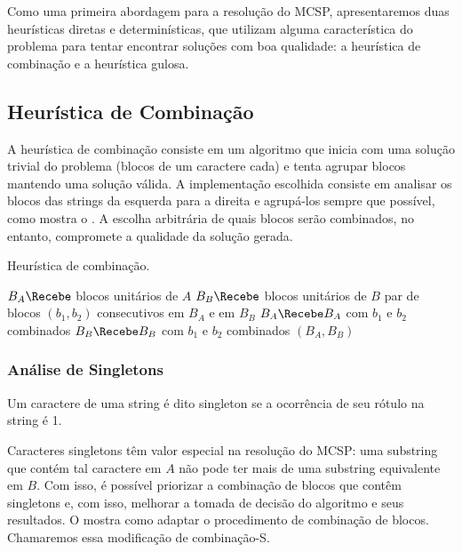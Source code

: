Como uma primeira abordagem para a resolução do MCSP, apresentaremos duas heurísticas diretas e determinísticas, que utilizam alguma característica do problema para tentar encontrar soluções com boa qualidade: a heurística de combinação e a heurística gulosa.

\subsection{Heurística de Combinação}

    A heurística de combinação consiste em um algoritmo que inicia com uma solução trivial do problema (blocos de um caractere cada) e tenta agrupar blocos mantendo uma solução válida. A implementação escolhida consiste em analisar os blocos das strings da esquerda para a direita e agrupá-los sempre que possível, como mostra o . A escolha arbitrária de quais blocos serão combinados, no entanto, compromete a qualidade da solução gerada.

    \begin{algorithm}[htb]
        \caption{Heurística de combinação.}
        \label{alg:combine}

        \begin{codebox}
        \li $B_A \Recebe$ blocos unitários de $A$
        \li $B_B \Recebe$ blocos unitários de $B$
        \li \Para \Cada par de blocos $(b_1, b_2)$ consecutivos em $B_A$ e em $B_B$ \Faca
            \Do
        \li     $B_A \Recebe B_A$ com $b_1$ e $b_2$ combinados
        \li     $B_B \Recebe B_B$ com $b_1$ e $b_2$ combinados
            \End
        \li \Devolva $(B_A, B_B)$
        \end{codebox}
    \end{algorithm}

    \subsubsection{Análise de Singletons}

        \begin{definition}[Singleton]
            Um caractere de uma string é dito singleton se a ocorrência de seu rótulo na string é 1.
        \end{definition}

        Caracteres singletons têm valor especial na resolução do MCSP: uma substring que contém tal caractere em $A$ não pode ter mais de uma substring equivalente em $B$. Com isso, é possível priorizar a combinação de blocos que contêm singletons e, com isso, melhorar a tomada de decisão do algoritmo e seus resultados. O  mostra como adaptar o procedimento de combinação de blocos. Chamaremos essa modificação de combinação-S.

